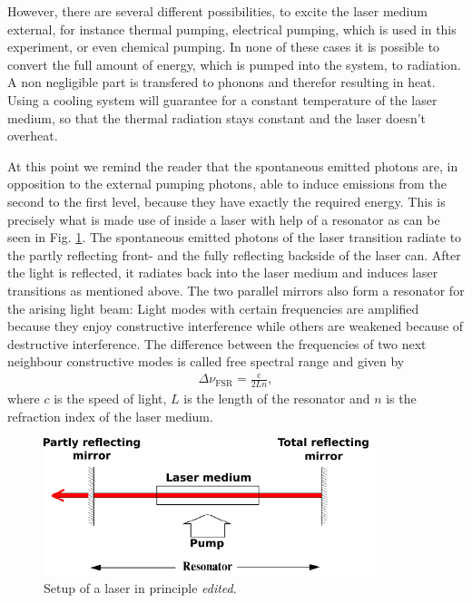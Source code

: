 However, there are several different possibilities, to excite the laser medium external, for instance thermal pumping,
electrical pumping, which is used in this experiment, or even chemical pumping.
In none of these cases it is possible to convert the full amount of energy, which is pumped into the system, to
radiation. A non negligible part is transfered to phonons and therefor resulting in heat.
Using a cooling system will guarantee for a constant temperature of the laser medium, so that the thermal radiation
stays constant and the laser doesn't overheat.

At this point we remind the reader that the spontaneous emitted photons are,
in opposition to the external pumping photons, able to induce emissions from the second to the first level,
because they have exactly the required energy. This is precisely what is made use of inside a laser with help
of a resonator as can be seen in Fig. \ref{fig:lasersetup}. The spontaneous emitted photons of the
laser transition radiate to the partly reflecting front- and the fully reflecting backside of the laser can.
After the light is reflected, it radiates back into the laser medium and induces laser transitions as mentioned above.
The two parallel mirrors also form a resonator for the arising light beam:
Light modes with certain frequencies are amplified because they enjoy constructive interference while others
are weakened because of destructive interference. The difference between the frequencies of two next neighbour
constructive modes is called free spectral range and given by
\begin{align}
  \Delta \nu_\text{FSR} = \frac{\text{c}}{2 L n},
  \label{eqn:freespectralrange}
\end{align}
where $c$ is the speed of light, $L$ is the length of the resonator and $n$ is the refraction index of the
laser medium.

\begin{figure}
  \centering
  \includegraphics[height = 4.0cm]{Ordnername/lasersetup_edit.pdf}
  \caption{Setup of a laser in principle \cite{manual2} \textit{edited}.}
  \label{fig:lasersetup}
\end{figure}

